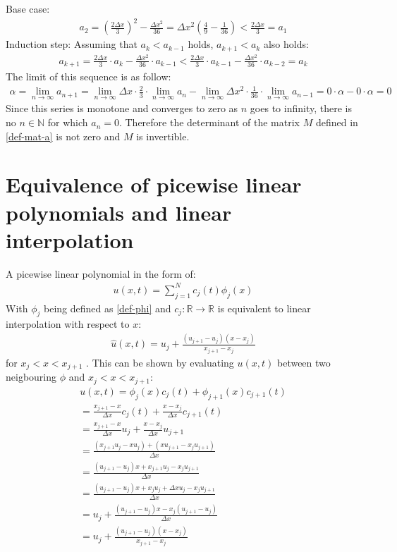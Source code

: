 Base case:
\begin{gather}
a_{2} = (\frac{2 \Delta x}{3})^{2} - \frac{\Delta x^{2}}{36} = \Delta x^{2} (\frac{4}{9} - \frac{1}{36}) < \frac{2 \Delta x}{3} = a_{1}
\end{gather}
Induction step: Assuming that \(a_k < a_{k-1}\) holds, \(a_{k+1} < a_{k}\) also holds:
\begin{gather}
a_{k+1} = \frac{2 \Delta x}{3} \cdot a_{k} - \frac{\Delta x^2}{36} \cdot a_{k-1}  < \frac{2 \Delta x}{3} \cdot a_{k-1} - \frac{\Delta x^2}{36} \cdot a_{k-2} = a_{k} 
\end{gather}
The limit of this sequence is as follow:
\begin{gather}
\alpha = \lim_{n \to \infty} a_{n+1} = \lim_{n \to \infty} \Delta x \cdot \frac{2}{3} \cdot \lim_{n \to \infty} a_{n} - \lim_{n \to \infty} \Delta x^{2} 
\cdot \frac{1}{36} \cdot \lim_{n \to \infty} a_{n-1} 
= 0 \cdot \alpha - 0 \cdot \alpha = 0
\end{gather}
Since this series is monotone and converges to zero as \(n\) goes to infinity, there is no \(n \in \mathbb{N}\) for which \(a_n = 0\). 
Therefore the determinant of the matrix \(M\) defined in \ref{def-mat-a} is not zero and \(M\) is invertible.
\section{Equivalence of picewise linear polynomials and linear interpolation} \label{ap-lin-interp}
A picewise linear polynomial in the form of:
\begin{gather}
u(x, t) = \sum_{j = 1}^{N} c_{j}(t)\phi_{j}(x)
\end{gather}
With \(\phi_{j}\) being defined as \ref{def-phi} and \(c_{j}: \mathbb{R} \rightarrow \mathbb{R} \) is equivalent to linear interpolation with respect to \(x\):
\begin{gather}
\hat{u}(x,t) =  u_{j} + \frac{(u_{j+1} - u_{j})(x-x_{j})}{x_{j+1} - x_{j}} 
\end{gather}
for \(x_{j} < x < x_{j+1}\) \cite{Bayen2015}. 
This can be shown by evaluating \(u(x, t)\) between two neigbouring \(\phi\) and \(x_{j} < x < x_{j+1}\):
\begin{gather}
u(x, t) = \phi_{j}(x) c_{j}(t) + \phi_{j+1}(x) c_{j+1}(t) \\
= \frac{x_{j+1} - x}{\Delta x} c_{j}(t) + \frac{x - x_{j}}{\Delta x} c_{j+1}(t) \\
= \frac{x_{j+1} - x}{\Delta x} u_{j} + \frac{x - x_{j}}{\Delta x} u_{j+1} \\
= \frac{(x_{j+1}u_{j} - xu_{j}) + (x u_{j+1}  - x_{j} u_{j+1})}{\Delta x} \\
= \frac{(u_{j+1} - u_{j})x + x_{j+1}u_{j} - x_{j} u_{j+1}}{\Delta x} \\
= \frac{(u_{j+1} - u_{j})x + x_{j}u_{j} + \Delta x u_{j} - x_{j} u_{j+1}}{\Delta x} \\
= u_{j} + \frac{(u_{j+1} - u_{j})x - x_{j}(u_{j+1} - u_{j})}{\Delta x} \\
= u_{j} + \frac{(u_{j+1} - u_{j})(x - x_{j})}{x_{j+1} - x_{j}}
\end{gather}




